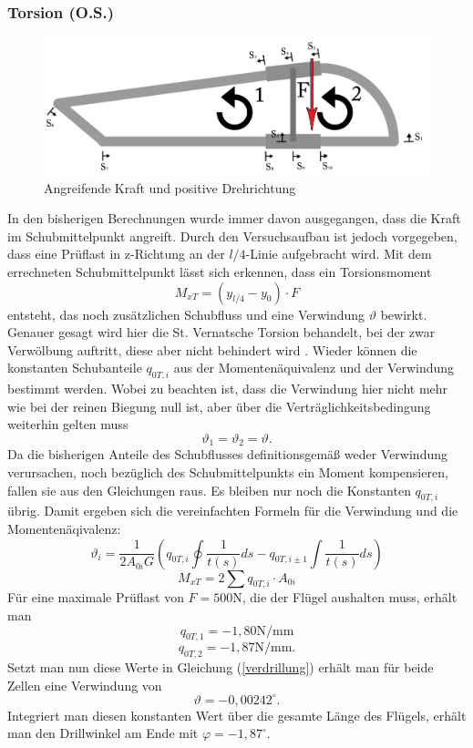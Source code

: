 \subsubsection{Torsion (O.S.)}
\begin{figure}[h]
	\centering
	\includegraphics[width=1\textwidth]{Bilder/Torsion}
	\caption{Angreifende Kraft und positive Drehrichtung}
\end{figure}
In den bisherigen Berechnungen wurde immer davon ausgegangen, dass die Kraft im Schubmittelpunkt angreift. Durch den Versuchsaufbau ist jedoch vorgegeben, dass eine Prüflast in z-Richtung an der $l/4$-Linie aufgebracht wird. Mit dem errechneten Schubmittelpunkt lässt sich erkennen, dass ein Torsionsmoment 
\begin{equation}
	M_{xT}=(y_{l/4}-y_{0})\cdot F
\end{equation}
entsteht, das noch zusätzlichen Schubfluss und eine Verwindung $\vartheta$ bewirkt. Genauer gesagt wird hier die St. Vernatsche Torsion behandelt, bei der zwar Verwölbung auftritt, diese aber nicht behindert wird \cite{item15}. Wieder können die konstanten Schubanteile $q_{0T,i}$ aus der Momentenäquivalenz und der Verwindung bestimmt werden. Wobei zu beachten ist, dass die Verwindung hier nicht mehr wie bei der reinen Biegung null ist, aber über die Verträglichkeitsbedingung weiterhin gelten muss
\begin{equation}
	\vartheta_{1}=\vartheta_{2}=\vartheta.
\end{equation}
Da die bisherigen Anteile des Schubflusses definitionsgemäß weder Verwindung verursachen, noch bezüglich des Schubmittelpunkts ein Moment kompensieren, fallen sie aus den Gleichungen raus. Es bleiben nur noch die Konstanten $q_{0T,i}$ übrig. Damit ergeben sich die vereinfachten Formeln für die Verwindung und die Momentenäqivalenz:
\begin{equation}\label{verdrillung}
	\vartheta_{i} = \frac{1}{2A_{0i}G}(q_{0T,i}\oint\frac{1}{t(s)}ds-q_{0T,i\pm1}\int\frac{1}{t(s)}ds)
\end{equation}
\begin{equation}
		M_{xT}=2\sum q_{0T,i}\cdot A_{0i}
\end{equation}
Für eine maximale Prüflast von $F=500\mathrm{N}$, die der Flügel aushalten muss, erhält man
$$
	q_{0T,1}=-1,80\mathrm{N/mm}
$$
$$
	q_{0T,2}=-1,87\mathrm{N/mm}.
$$
Setzt man nun diese Werte in Gleichung (\ref{verdrillung}) erhält man für beide Zellen eine Verwindung von
$$
	\vartheta =-0,00242 ^\circ.
$$
Integriert man diesen konstanten Wert über die gesamte Länge des Flügels, erhält man den Drillwinkel am Ende mit $\varphi = -1,87^\circ$.

